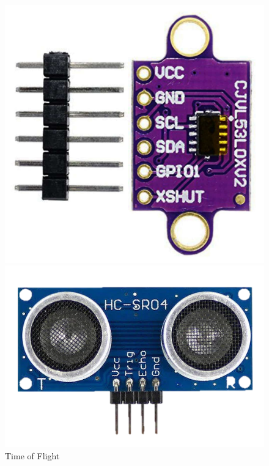 \vspace{1.0em}

\begin{figure}[H]
    \centering
    \begin{minipage}{0.3\textwidth}
        \centering
        \includegraphics[width=\linewidth]{pics/tof.png}
        \caption{Time of Flight}\label{tof}
    \end{minipage}\hfill
    \begin{minipage}{0.3\textwidth}
        \centering
        \includegraphics[width=\linewidth]{pics/hcrs04.png}

\end{minipage}
\end{figure}
